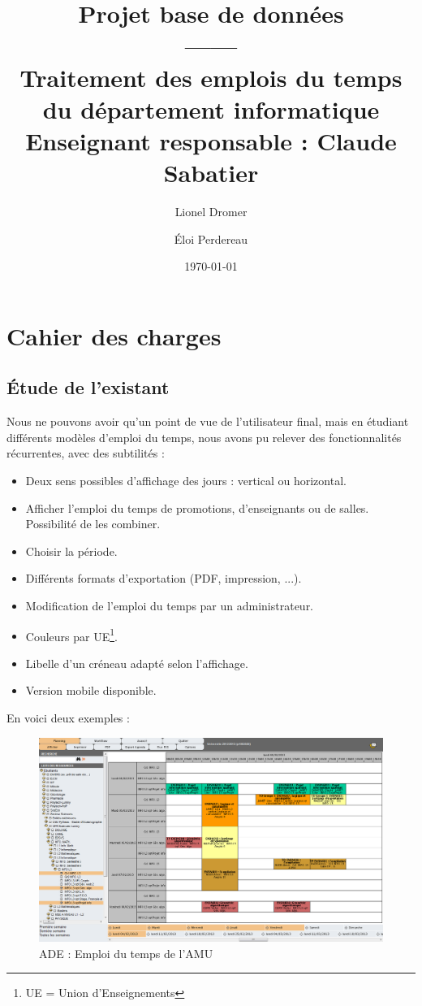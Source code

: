 \documentclass{article}
\title{Projet base de données\\
------ \\
\large{Traitement des emplois du temps du département informatique}\\
\small{Enseignant responsable : Claude Sabatier}}
\author{Lionel Dromer \and \'Eloi Perdereau}
\date{\today}
\begin{document}
\maketitle
\tableofcontents
\newpage

\section{Cahier des charges}

\subsection{\'Etude de l'existant}
Nous ne pouvons avoir qu'un point de vue de l'utilisateur final, mais en étudiant différents modèles d'emploi du temps, nous avons pu relever des fonctionnalités récurrentes, avec des subtilités :
\begin{itemize}
\item Deux sens possibles d'affichage des jours : vertical ou horizontal.
\item Afficher l'emploi du temps de promotions, d'enseignants ou de salles. Possibilité de les combiner.
\item Choisir la période.
\item Différents formats d'exportation (PDF, impression, ...).
\item Modification de l'emploi du temps par un administrateur.
\item Couleurs par UE\footnote{UE = Union d'Enseignements}.
\item Libelle d'un créneau adapté selon l'affichage.
\item Version mobile disponible.
\end{itemize}

En voici deux exemples :

\begin{figure}[!ht]
\begin{center}
\includegraphics[scale=0.5]{img/edt_ade.png}
\caption{ADE : Emploi du temps de l'AMU}
\end{center}
\end{figure}
\end{document}
